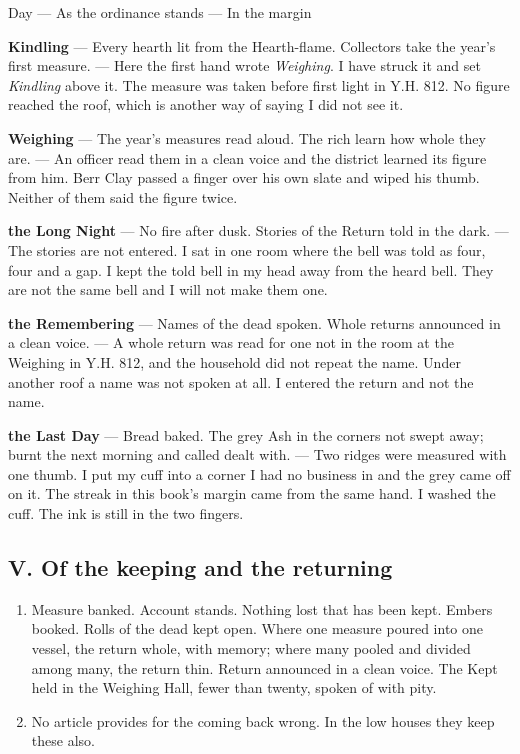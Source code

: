 \documentclass{design/chronicle}
\begin{document}
Day — As the ordinance stands — In the margin\par

\textbf{Kindling} — Every hearth lit from the Hearth-flame. Collectors take the year’s first measure. — Here the first hand wrote \emph{Weighing}. I have struck it and set \emph{Kindling} above it. The measure was taken before first light in Y.H. 812. No figure reached the roof, which is another way of saying I did not see it.\par

\textbf{Weighing} — The year’s measures read aloud. The rich learn how whole they are. — An officer read them in a clean voice and the district learned its figure from him. Berr Clay passed a finger over his own slate and wiped his thumb. Neither of them said the figure twice.\par

\textbf{the Long Night} — No fire after dusk. Stories of the Return told in the dark. — The stories are not entered. I sat in one room where the bell was told as four, four and a gap. I kept the told bell in my head away from the heard bell. They are not the same bell and I will not make them one.\par

\textbf{the Remembering} — Names of the dead spoken. Whole returns announced in a clean voice. — A whole return was read for one not in the room at the Weighing in Y.H. 812, and the household did not repeat the name. Under another roof a name was not spoken at all. I entered the return and not the name.\par

\textbf{the Last Day} — Bread baked. The grey Ash in the corners not swept away; burnt the next morning and called dealt with. — Two ridges were measured with one thumb. I put my cuff into a corner I had no business in and the grey came off on it. The streak in this book’s margin came from the same hand. I washed the cuff. The ink is still in the two fingers.\par

\subsection*{V. Of the keeping and the returning}

\begin{enumerate}[leftmargin=1.4em,itemsep=1pt,topsep=3pt,parsep=0pt]

\item Measure banked. Account stands. Nothing lost that has been kept. Embers booked. Rolls of the dead kept open. Where one measure poured into one vessel, the return whole, with memory; where many pooled and divided among many, the return thin. Return announced in a clean voice. The Kept held in the Weighing Hall, fewer than twenty, spoken of with pity.

\item No article provides for the coming back wrong. In the low houses they keep these also.

\end{enumerate}
\end{document}
